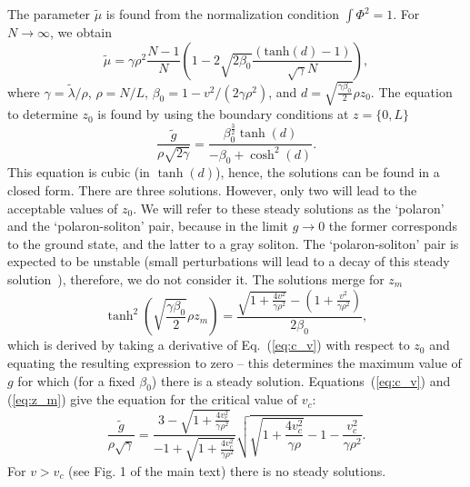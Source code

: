 \documentclass[twocolumn,amsmath,amssymb,showpacs,prl,superscriptaddress,aps]{revtex4-1}
\begin{document}
The parameter $\tilde \mu$ is found from the normalization condition $\int \Phi^2=1$. For $N\to\infty$, we obtain
\begin{equation}
\tilde \mu=\gamma \rho^2 \frac{N-1}{N}\left(1-2\sqrt{2\beta_0} \frac{ (\mathrm{tanh}(d)-1)}{\sqrt{\gamma}N}\right),
\end{equation}
where $\gamma=\tilde \lambda /\rho$, $\rho=N/L$, $\beta_0=1-v^2/(2\gamma \rho^2)$, and $d=\sqrt{\frac{\gamma \beta_0}{2}}\rho z_0$.
The equation to determine $z_0$ is found by using the boundary conditions at $z=\{0,L\}$
\begin{equation}
\frac{\tilde g}{\rho \sqrt{2\gamma}}=\frac{\beta_0^{\frac{3}{2}}\tanh(d)}{-\beta_0+\cosh^2(d)}.
\label{eq:c_v}
\end{equation}
This equation is cubic (in $\tanh(d)$), hence, the solutions can be found in a closed form.
There are three solutions. However, only two will lead to the acceptable values of $z_0$. 
We will refer to these steady solutions as the `polaron' and the `polaron-soliton' pair, because in the limit $g\to 0$ the former 
corresponds to the ground state, and the latter to a gray soliton. 
The `polaron-soliton' pair is expected to be unstable (small perturbations will lead to 
a decay of this steady solution~\cite{hakim1997}),
therefore, we do not consider it. The solutions merge for $z_m$ 
\begin{equation}
\tanh^2\left(\sqrt{\frac{\gamma \beta_0}{2}}\rho z_m\right)=\frac{\sqrt{1+\frac{4v^2}{\gamma \rho^2}}-(1+\frac{v^2}{\gamma \rho^2})}{2\beta_0},
\label{eq:z_m}
\end{equation}
which is derived by taking a derivative of Eq.~(\ref{eq:c_v}) with respect to $z_0$ and equating the resulting expression to zero -- this determines 
the maximum value of $g$ for which (for a fixed $\beta_0$) there is a steady solution.
Equations~(\ref{eq:c_v}) and (\ref{eq:z_m}) give the equation for the critical value of $v_c$:
\begin{equation}
\frac{\tilde g}{\rho\sqrt{\gamma}}=\frac{3-\sqrt{1+\frac{4v_c^2}{\gamma \rho^2}}}{-1+\sqrt{1+\frac{4v_c^2}{\gamma \rho^2}}}\sqrt{\sqrt{1+\frac{4v_c^2}{\gamma \rho}}-1-\frac{v_c^2}{\gamma\rho^2}}.
\end{equation}
For $v>v_c$ (see Fig. 1 of the main text) there is no steady solutions.
\end{document}
